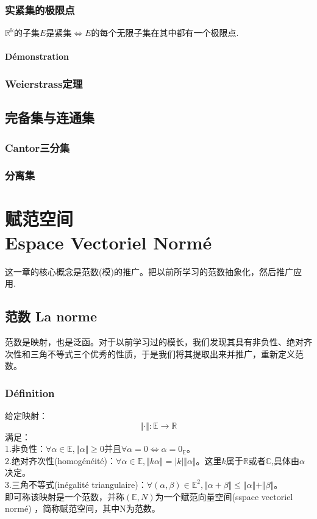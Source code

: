 \documentclass[12pt, a4paper, oneside]{ctexbook}
\begin{document}
  \subsection{实紧集的极限点}
  $\mathbb{R^k}$的子集$E$是紧集$\Leftrightarrow$$E$的每个无限子集在其中都有一个极限点.
  \subsubsection{Démonstration}
  \subsection{Weierstrass定理}

  \section{完备集与连通集}
  \subsection{Cantor三分集}
  \subsection{分离集}


  

\chapter{赋范空间\\Espace Vectoriel Normé}
  这一章的核心概念是范数(模)的推广。把以前所学习的范数抽象化，然后推广应用.
\section{范数 La norme}
  范数是映射，也是泛函。对于以前学习过的模长，我们发现其具有非负性、绝对齐次性和三角不等式三个优秀的性质，于是我们将其提取出来并推广，重新定义范数。
  \subsection{Définition}
  给定映射：
  $$
  \Vert \cdot \Vert : \mathbb{E} \longrightarrow \mathbb{R}
  $$
  满足：\\
  1.非负性：$\forall\alpha\in\mathbb{E}, \Vert \alpha \Vert\ge0$并且$\forall\alpha=0\Leftrightarrow \alpha=0_\mathbb{E}$。\\
  2.绝对齐次性(homogénéité)：$\forall\alpha\in\mathbb{E}, \Vert k\alpha \Vert=| k | \Vert \alpha \Vert$。这里$k$属于$\mathbb{R}$或者$\mathbb{C}$,具体由$\alpha$决定。\\
  3.三角不等式(inégalité triangulaire)：$\forall(\alpha,\beta)\in\mathbb{E}^2, \Vert \alpha+\beta \Vert\leq\Vert \alpha \Vert+\Vert \beta \Vert$。\\
  即可称该映射是一个范数，并称$(\mathbb{E},N)$为一个赋范向量空间(sspace vectoriel normé)
  ，简称赋范空间，其中N为范数。
\end{document}
